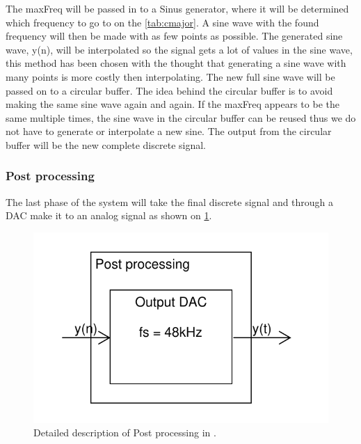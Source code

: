 The maxFreq will be passed in to a Sinus generator, where it will be determined which frequency to go to on the \cref{tab:cmajor}. A sine wave with the found frequency will then be made with as few points as possible. The generated sine wave, y(n), will be interpolated so the signal gets a lot of values in the sine wave, this method has been chosen with the thought that generating a sine wave with many points is more costly then interpolating. The new full sine wave will be passed on to a circular buffer. The idea behind the circular buffer is to avoid making the same sine wave again and again. If the maxFreq appears to be the same multiple times, the sine wave in the circular buffer can be reused thus we do not have to generate or interpolate a new sine. The output from the circular buffer will be the new complete discrete signal.

\subsubsection{Post processing}
The last phase of the system will take the final discrete signal and through a DAC make it to an analog signal as shown on \cref{fig:DetailedPostPro}.
\begin{figure}
	\centering
	\includegraphics[width=1\linewidth]{gfx/Design/DesignPostPro_IF.pdf}
	\caption{Detailed description of Post processing in \systemName.}
	\label{fig:DetailedPostPro}
\end{figure}

